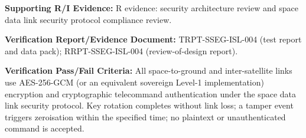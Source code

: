 \par\textbf{Supporting R/I Evidence:} R evidence: security architecture review and space data link security protocol compliance review.
\par\textbf{Verification Report/Evidence Document:} TRPT-SSEG-ISL-004 (test report and data pack); RRPT-SSEG-ISL-004 (review-of-design report).
\par\textbf{Verification Pass/Fail Criteria:} All space-to-ground and inter-satellite links use AES-256-GCM (or an equivalent sovereign Level-1 implementation) encryption and cryptographic telecommand authentication under the space data link security protocol. Key rotation completes without link loss; a tamper event triggers zeroisation within the specified time; no plaintext or unauthenticated command is accepted.
\par\medskip
